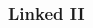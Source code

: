 \begin{frame}[fragile]
\frametitle{Linked II}
\begin{columns}[T]

\begin{column}{0.45\textwidth}

\end{column}

\pause
\begin{column}{0.45\textwidth}

\end{column}


\end{columns}
\end{frame}
